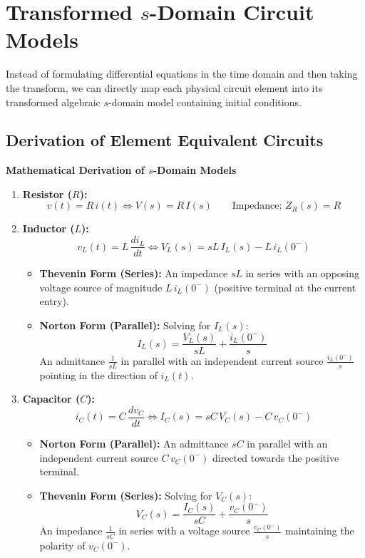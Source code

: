 \documentclass[12pt,a4paper]{article}
\begin{document}
\section{Transformed $s$-Domain Circuit Models}

Instead of formulating differential equations in the time domain and then taking the transform, we can directly map each physical circuit element into its transformed algebraic $s$-domain model containing initial conditions.

\subsection{Derivation of Element Equivalent Circuits}

\textbf{Mathematical Derivation of $s$-Domain Models}
\begin{enumerate}[leftmargin=*]
  \item \textbf{Resistor ($R$):}
  \begin{equation}
    v(t) = R\,i(t) \iff V(s) = R\,I(s) \qquad \text{Impedance: } Z_R(s) = R
  \end{equation}
  \item \textbf{Inductor ($L$):}
  \begin{equation}
    v_L(t) = L\,\frac{di_L}{dt} \iff V_L(s) = sL\,I_L(s) - L\,i_L(0^-)
  \end{equation}
  \begin{itemize}
    \item \textbf{Thevenin Form (Series):} An impedance $sL$ in series with an opposing voltage source of magnitude $L\,i_L(0^-)$ (positive terminal at the current entry).
    \item \textbf{Norton Form (Parallel):} Solving for $I_L(s)$:
    \begin{equation}
      I_L(s) = \frac{V_L(s)}{sL} + \frac{i_L(0^-)}{s}
    \end{equation}
    An admittance $\frac{1}{sL}$ in parallel with an independent current source $\frac{i_L(0^-)}{s}$ pointing in the direction of $i_L(t)$.
  \end{itemize}
  \item \textbf{Capacitor ($C$):}
  \begin{equation}
    i_C(t) = C\,\frac{dv_C}{dt} \iff I_C(s) = sC\,V_C(s) - C\,v_C(0^-)
  \end{equation}
  \begin{itemize}
    \item \textbf{Norton Form (Parallel):} An admittance $sC$ in parallel with an independent current source $C\,v_C(0^-)$ directed towards the positive terminal.
    \item \textbf{Thevenin Form (Series):} Solving for $V_C(s)$:
    \begin{equation}
      V_C(s) = \frac{I_C(s)}{sC} + \frac{v_C(0^-)}{s}
    \end{equation}
    An impedance $\frac{1}{sC}$ in series with a voltage source $\frac{v_C(0^-)}{s}$ maintaining the polarity of $v_C(0^-)$.
  \end{itemize}
\end{enumerate}
\end{document}
